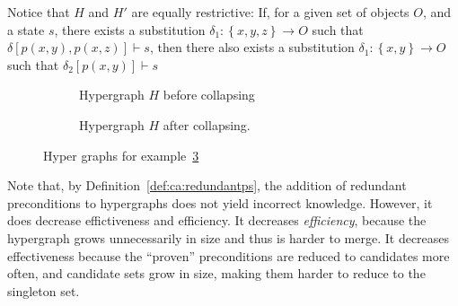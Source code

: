 \documentclass[../Master.tex]{subfiles}
\providecommand{\master}{..}
\begin{document}
\begin{example}
	Notice that $H$ and $H'$ are equally restrictive: If, for a given set of objects $O$, and a state $s$, there exists a substitution $\delta_1 : \left\{x, y, z\right\} \rightarrow O$ such that $\delta\left[p(x,y), p(x,z)\right] \vdash s$, then there also exists a substitution $\delta_1 : \left\{x, y\right\} \rightarrow O$ such that $\delta_2\left[p(x,y)\right] \vdash s$

	\begin{figure}
        \centering
        \hfill
        \begin{subfigure}[b]{0.4\textwidth}
            \centering
            \resizebox{0.7\linewidth}{!}{}
            \caption{Hypergraph $H$ before collapsing}
            \label{fig:ex:ca:hgma:ex:isomorphic}
        \end{subfigure}%
        \hfill%
        \begin{subfigure}[b]{0.4\textwidth}
            \centering
            \resizebox{0.75\linewidth}{!}{}
            \caption{Hypergraph $H$ after collapsing.}
            \label{fig:ex:ca:hgma:ex:isomorphicReduced}
        \end{subfigure}
		\caption{Hyper graphs for example~\ref{fig:ex:ca:hgma:ex:collapsing}}\label{fig:ex:ca:hgma:ex:collapsing}
        \hfill
    \end{figure}
\end{example}



Note that, by Definition~\ref{def:ca:redundantps}, the addition of redundant preconditions to hypergraphs does not yield incorrect knowledge. However, it does decrease effictiveness and efficiency. It decreases \textit{efficiency}, because the hypergraph grows unnecessarily in size and thus is harder to merge. It decreases effectiveness because the ``proven'' preconditions are reduced to candidates more often, and candidate sets grow in size, making them harder to reduce to the singleton set.
\end{document}
